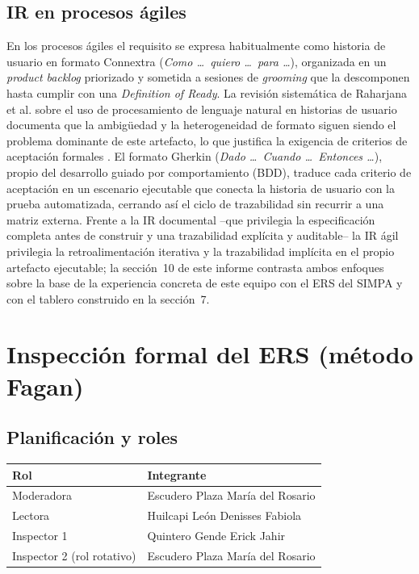 \documentclass[11pt,a4paper]{article}
\begin{document}
\subsection{IR en procesos ágiles}

En los procesos ágiles el requisito se expresa habitualmente como historia de usuario en formato
Connextra (\emph{Como \dots\ quiero \dots\ para \dots}), organizada en un \emph{product backlog}
priorizado y sometida a sesiones de \emph{grooming} que la descomponen hasta cumplir con una
\emph{Definition of Ready}. La revisión sistemática de Raharjana et al. sobre el uso de
procesamiento de lenguaje natural en historias de usuario documenta que la ambigüedad y la
heterogeneidad de formato siguen siendo el problema dominante de este artefacto, lo que justifica
la exigencia de criterios de aceptación formales \cite{raharjana2021}. El formato Gherkin
(\emph{Dado \dots\ Cuando \dots\ Entonces \dots}), propio del desarrollo guiado por
comportamiento (BDD), traduce cada criterio de aceptación en un escenario ejecutable que conecta
la historia de usuario con la prueba automatizada, cerrando así el ciclo de trazabilidad sin
recurrir a una matriz externa. Frente a la IR documental --que privilegia la especificación
completa antes de construir y una trazabilidad explícita y auditable-- la IR ágil privilegia la
retroalimentación iterativa y la trazabilidad implícita en el propio artefacto ejecutable; la
sección~10 de este informe contrasta ambos enfoques sobre la base de la experiencia concreta de
este equipo con el ERS del SIMPA y con el tablero construido en la sección~7.

\section{Inspección formal del ERS (método Fagan)}

\subsection{Planificación y roles}

\begin{center}
\begin{tabular}{ll}
\toprule
\textbf{Rol} & \textbf{Integrante} \\
\midrule
Moderadora & Escudero Plaza María del Rosario \\
Lectora & Huilcapi León Denisses Fabiola \\
Inspector 1 & Quintero Gende Erick Jahir \\
Inspector 2 (rol rotativo) & Escudero Plaza María del Rosario \\
\bottomrule
\end{tabular}
\end{center}
\end{document}

